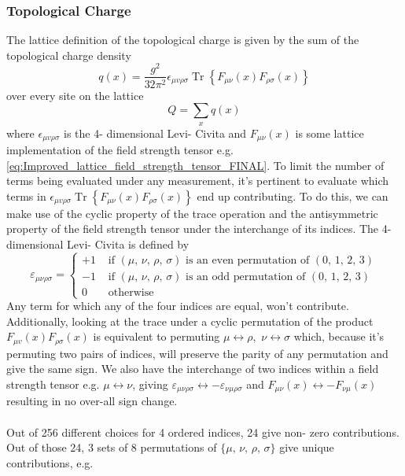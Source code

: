 \documentclass[a4paper,10pt]{article}
\begin{document}
\subsubsection{Topological Charge}
The lattice definition of the topological charge is given by the sum of the topological charge density 
\begin{equation}
q(x)=\frac{g^{2}}{32 \pi^{2}} \epsilon_{\mu v \rho \sigma} \operatorname{Tr}\left\{F_{\mu \nu}(x) F_{\rho \sigma}(x)\right\}
\end{equation}
over every site on the lattice
\begin{equation}
Q=\sum_{x} q(x)
\end{equation}
where $\epsilon_{\mu v \rho \sigma}$ is the 4- dimensional Levi- Civita and $F_{\mu \nu}(x)$ is some lattice implementation of the field strength tensor e.g. \eqref{eq:Improved_lattice_field_strength_tensor_FINAL}. To limit the number of terms being evaluated under any measurement, it's pertinent to evaluate which terms in $\epsilon_{\mu v \rho \sigma} \operatorname{Tr}\left\{F_{\mu \nu}(x) F_{\rho \sigma}(x)\right\} $ end up contributing. To do this, we can make use of the cyclic property of the trace operation and the antisymmetric property of the field strength tensor under the interchange of its indices. The 4- dimensional Levi- Civita is defined by 
\begin{equation}
\varepsilon_{\mu\nu\rho\sigma}=\left\{\begin{aligned}
+1 & \text { if }(\mu,\,\nu,\,\rho,\,\sigma) \text { is an even permutation of }(0,\,1,\,2,\,3) \\
-1 & \text { if }(\mu,\,\nu,\,\rho,\,\sigma) \text { is an odd permutation of }(0,\,1,\,2,\,3) \\
0 & \text { otherwise }
\end{aligned}\right.
\end{equation}
Any term for which any of the four indices are equal, won't contribute. Additionally, looking at the trace under a cyclic permutation of the product $F_{\mu v}(x) F_{\rho \sigma}(x)$ is equivalent to permuting $\mu \leftrightarrow \rho,\,\,\nu \leftrightarrow \sigma $ which, because it's permuting two pairs of indices, will preserve the parity of any permutation and give the same sign. We also have the interchange of two indices within a field strength tensor e.g. $ \mu \leftrightarrow \nu$, giving $\varepsilon_{\mu\nu\rho\sigma} \leftrightarrow -\varepsilon_{\nu\mu\rho\sigma}$ and $F_{\mu \nu}(x) \leftrightarrow -F_{\nu \mu}(x)$ resulting in no over-all sign change.\\\\Out of 256 different choices for 4 ordered indices, 24 give non- zero contributions. Out of those 24, 3 sets of 8 permutations of $\{ \mu,\,\nu,\,\rho,\,\sigma\}$ give unique contributions, e.g.  
\end{document}
